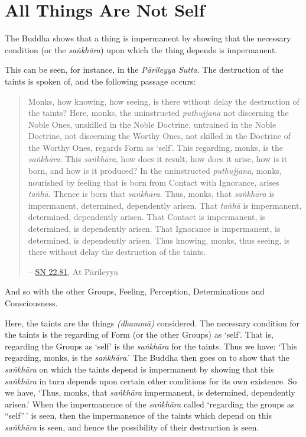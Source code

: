 \chapter{All Things Are Not Self}

The Buddha shows that a thing is impermanent by showing that the necessary condition (or the \emph{saṅkhāra}) upon which the thing depends is impermanent.

This can be seen, for instance, in the \emph{Pārileyya Sutta}. The destruction of the taints is spoken of, and the following passage occurs:

\begin{quote}
Monks, how knowing, how seeing, is there without delay the destruction of the taints? Here, monks, the uninstructed \emph{puthujjana} not discerning the Noble Ones, unskilled in the Noble Doctrine, untrained in the Noble Doctrine, not discerning the Worthy Ones, not skilled in the Doctrine of the Worthy Ones, regards Form as `self'. This regarding, monks, is the \emph{saṅkhāra}. This \emph{saṅkhāra}, how does it result, how does it arise, how is it born, and how is it produced? In the uninstructed \emph{puthujjana}, monks, nourished by feeling that is born from Contact with Ignorance, arises \emph{taṅhā}. Thence is born that \emph{saṅkhāra}. Thus, monks, that \emph{saṅkhāra} is impermanent, determined, dependently arisen. That \emph{taṅhā} is impermanent, determined, dependently arisen. That Contact is impermanent, is determined, is dependently arisen. That Ignorance is impermanent, is determined, is dependently arisen. Thus knowing, monks, thus seeing, is there without delay the destruction of the taints.

 -- \href{https://suttacentral.net/sn22.81/en/bodhi}{SN 22.81}, At Pārileyya
\end{quote}

And so with the other Groups, Feeling, Perception, Determinations and Consciousness.

Here, the taints are the things \emph{(dhammā)} considered. The necessary condition for the taints is the regarding of Form (or the other Groups) as `self'. That is, regarding the Groups as `self' is the \emph{saṅkhāra} for the taints. Thus we have: `This regarding, monks, is the \emph{saṅkhāra}.' The Buddha then goes on to show that the \emph{saṅkhāra} on which the taints depend is impermanent by showing that this \emph{saṅkhāra} in turn depends upon certain other conditions for its own existence. So we have, `Thus, monks, that \emph{saṅkhāra} impermanent, is determined, dependently arisen.' When the impermanence of the \emph{saṅkhāra} called `regarding the groups as ``self''\,' is seen, then the impermanence of the taints which depend on this \emph{saṅkhāra} is seen, and hence the possibility of their destruction is seen.

